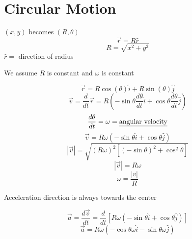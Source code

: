 \documentclass[fleqn]{article}
\begin{document}
\setlength{\mathindent}{0pt}
\section*{Circular Motion}
$(x,y)$ becomes $(R, \theta)$
\[ \vec{r} = R \hat{r} \]
\[ R = \sqrt{x^2+y^2}  \]
$\hat{r}=$ direction of radius

We assume $R$ is constant and $\omega$ is constant

\[ \vec{r} = R \cos (\theta) \hat{i} + R \sin(\theta) \hat{j} \]
\[ \vec{v} = \frac{d}{dt} \vec{r} = R \left( - \sin \theta \frac{d \theta}{dt} \hat{i} + \cos \theta \frac{d \theta}{dt} \hat{j}  \right) \]
\[ \frac{d \theta}{dt} = \omega = \text{\underline{angular velocity}}  \]
\[ \vec{v} = R \omega \left( - \sin \theta \hat{i} + \cos \theta \hat{j}\right) \]
\[ |\vec{v} | = \sqrt{(R \omega)^2 \left[ (- \sin \theta)^2 + \cos ^2 \theta \right]} \]
\[ |\vec{v} | = R \omega \]
\[ \omega = \frac{|v|}{R}  \]

Acceleration direction is always towards the center

\[ \vec{a} = \frac{d \vec{v} }{dt} = \frac{d}{dt} \left[ R \omega (- \sin \theta \hat{i} + \cos \theta \hat{j}) \right] \]
\[ \vec{a} = R \omega (- \cos \theta \omega \hat{i} - \sin \theta \omega \hat{j}) \]
\end{document}
